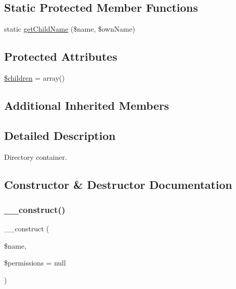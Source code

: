 \subsection*{Static Protected Member Functions}
\begin{DoxyCompactItemize}
\item 
static \mbox{\hyperlink{classorg_1_1bovigo_1_1vfs_1_1vfs_stream_directory_ac2333db8d3cfa0155f5bc315f2fff330}{get\+Child\+Name}} (\$name, \$own\+Name)
\end{DoxyCompactItemize}
\subsection*{Protected Attributes}
\begin{DoxyCompactItemize}
\item 
\mbox{\hyperlink{classorg_1_1bovigo_1_1vfs_1_1vfs_stream_directory_aafda1a84fe840800c9884c167093f759}{\$children}} = array()
\end{DoxyCompactItemize}
\subsection*{Additional Inherited Members}


\subsection{Detailed Description}
Directory container.

\subsection{Constructor \& Destructor Documentation}
\mbox{\label{classorg_1_1bovigo_1_1vfs_1_1vfs_stream_directory_acb8ea4ab5eedb93ea03a6628f5915f04}} 
\subsubsection{\texorpdfstring{\+\_\+\+\_\+construct()}{\_\_construct()}}
{\footnotesize\ttfamily \+\_\+\+\_\+construct (\begin{DoxyParamCaption}\item[{}]{\$name,  }\item[{}]{\$permissions = {\ttfamily null} }\end{DoxyParamCaption})}

